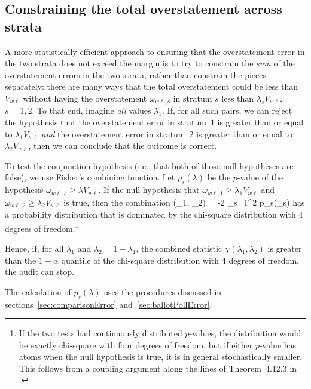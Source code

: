 \subsection{Constraining the total overstatement across strata}
A more statistically efficient approach to ensuring that the overstatement error in the 
two strata does not
exceed the margin is to try to constrain the \emph{sum} of the overstatement errors in the two
strata, rather than constrain the pieces separately:
there are many ways that the total overstatement could be less than $V_{w\ell}$ without
having the overstatement $\omega_{w\ell,s}$
in stratum $s$ less than $\lambda_s V_{w\ell}$, $s = 1, 2$.
To that end, imagine \emph{all} values $\lambda_1$.
If, for all such pairs, we can reject the hypothesis that the 
overstatement error in stratum~1 is greater than or equal to $\lambda_1 V_{w\ell}$ \emph{and} 
the overstatement error in stratum~2 is greater than or equal to $\lambda_2 V_{w\ell}$, then
we can conclude that the outcome is correct.

To test the conjunction hypothesis (i.e., that both of those null hypotheses are false), we use 
Fisher's combining function.
Let $p_s(\lambda)$ be the $p$-value of the hypothesis $\omega_{w\ell,s} \ge \lambda V_{w\ell}$.
If the null hypothesis that $\omega_{w\ell,1} \ge \lambda_1 V_{w\ell}$ and 
$\omega_{w\ell,2} \ge \lambda_2 V_{w\ell}$ is true, then the combination
\beq
   \chi(\lambda_1, \lambda_2) = -2 \sum_{s=1}^2 \ln p_s(\lambda_s)
\eeq
has a probability distribution that is dominated by the chi-square distribution with 4 degrees
of freedom.\footnote{%
   If the two tests had continuously distributed $p$-values, the distribution would be exactly
   chi-square with four degrees of freedom, but if either $p$-value has atoms when
   the null hypothesis is true, it is in general stochastically smaller.
   This follows from a coupling argument along the lines of Theorem~4.12.3 in \citet{grimmett01}.
}

Hence, if, for all $\lambda_1$ and $\lambda_2 = 1- \lambda_1$,
the combined statistic $\chi(\lambda_1, \lambda_2)$ is greater than the 
$1-\alpha$ quantile of the chi-square
distribution with 4 degrees of freedom, the audit can stop.

The calculation of $p_s(\lambda)$ 
uses the procedures discussed in 
sections~\ref{sec:comparisonError} and~\ref{sec:ballotPollError}.